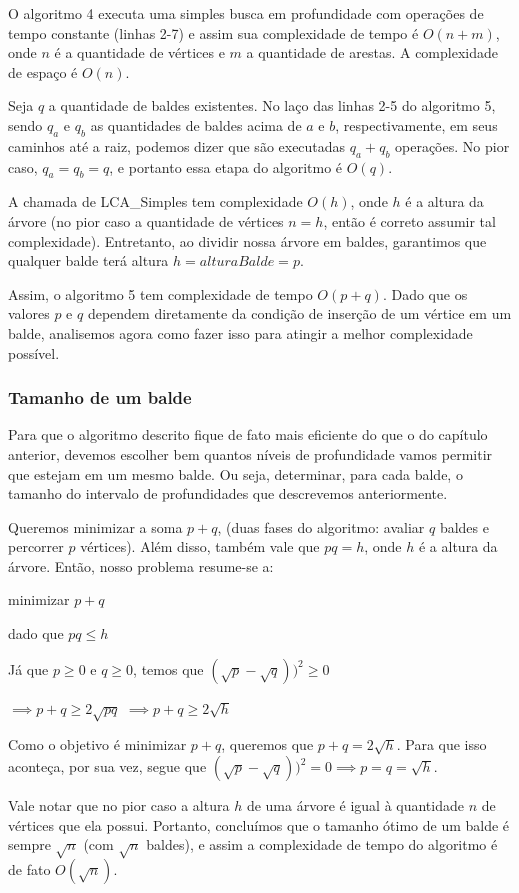 O algoritmo 4 executa uma simples busca em profundidade com operações de tempo constante (linhas 2-7) e assim sua complexidade de tempo é $O(n+m)$, onde $n$ é a quantidade de vértices e $m$ a quantidade de arestas. A complexidade de espaço é $O(n)$.

Seja $q$ a quantidade de baldes existentes. No laço das linhas 2-5 do algoritmo 5, sendo $q_a$ e $q_b$ as quantidades de baldes acima de $a$ e $b$, respectivamente, em seus caminhos até a raiz, podemos dizer que são executadas $q_a + q_b$ operações. No pior caso, $q_a = q_b = q$, e portanto essa etapa do algoritmo é $O(q)$.

A chamada de LCA\_Simples tem complexidade $O(h)$, onde $h$ é a altura da árvore (no pior caso a quantidade de vértices $n = h$, então é correto assumir tal complexidade). Entretanto, ao dividir nossa árvore em baldes, garantimos que qualquer balde terá altura $h = alturaBalde = p$.

Assim, o algoritmo 5 tem complexidade de tempo $O(p + q)$. Dado que os valores $p$ e $q$ dependem diretamente da condição de inserção de um vértice em um balde, analisemos agora como fazer isso para atingir a melhor complexidade possível.

\vspace{0.8cm}

\subsubsection{Tamanho de um balde}

Para que o algoritmo descrito fique de fato mais eficiente do que o do capítulo anterior, devemos escolher bem quantos níveis de profundidade vamos permitir que estejam em um mesmo balde. Ou seja, determinar, para cada balde, o tamanho do intervalo de profundidades que descrevemos anteriormente.

Queremos minimizar a soma $p + q$, (duas fases do algoritmo: avaliar $q$ baldes e percorrer $p$ vértices). Além disso, também vale que $pq = h$, onde $h$ é a altura da árvore. Então, nosso problema resume-se a:

\centerline{minimizar $p + q$}
\centerline{dado que $pq \leq h$}

\hspace{1cm}

Já que $p \geq 0$ e $q \geq 0$, temos que $(\sqrt{p} - \sqrt{q}))^2 \geq 0$

$\implies p + q \geq 2\sqrt{pq}$
$\implies p + q \geq 2\sqrt{h}$

\hspace{1cm}

Como o objetivo é minimizar $p + q$, queremos que $p + q = 2\sqrt{h}$. Para que isso aconteça, por sua vez, segue que $(\sqrt{p} - \sqrt{q}))^2 = 0 \implies p = q = \sqrt{h}$.

\hspace{1cm}

Vale notar que no pior caso a altura $h$ de uma árvore é igual à quantidade $n$ de vértices que ela possui. Portanto, concluímos que o tamanho ótimo de um balde é sempre $\sqrt{n}$ (com $\sqrt{n}$ baldes), e assim a complexidade de tempo do algoritmo é de fato $O(\sqrt{n})$.

